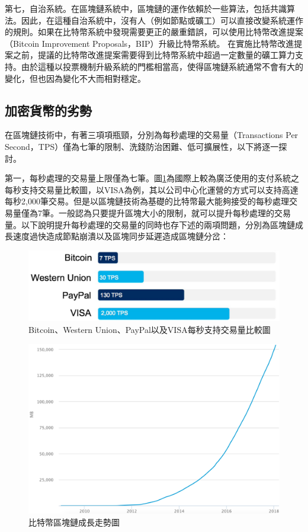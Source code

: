 				第七，自治系統。在區塊鏈系統中，區塊鏈的運作依賴於一些算法，包括共識算法。因此，在這種自治系統中，沒有人（例如節點或礦工）可以直接改變系統運作的規則。如果在比特幣系統中發現需要更正的嚴重錯誤，可以使用比特幣改進提案（Bitcoin Improvement Proposals，BIP）\supercite{BitcoinImprovementProposals}升級比特幣系統。 在實施比特幣改進提案之前，提議的比特幣改進提案需要得到比特幣系統中超過一定數量的礦工算力支持。由於這種以投票機制升級系統的門檻相當高，使得區塊鏈系統通常不會有大的變化，但也因為變化不大而相對穩定。

			\subsection{加密貨幣的劣勢}
			在區塊鏈技術中，有著三項項瓶頸，分別為每秒處理的交易量（Transactions Per Second，TPS）僅為七筆的限制、洗錢防治困難、低可擴展性，以下將逐一探討。

				第一，每秒處理的交易量上限僅為七筆。圖\ref{TPS}為國際上較為廣泛使用的⽀付系統之每秒⽀持交易量⽐較圖，以VISA為例，其以公司中心化運營的方式可以支持高達每秒2,000筆交易。但是以區塊鏈技術為基礎的比特幣最大能夠接受的每秒處理交易量僅為7筆。一般認為只要提升區塊大小的限制，就可以提升每秒處理的交易量。以下說明提升每秒處理的交易量的同時也存下述的兩項問題，分別為區塊鏈成長速度過快造成節點崩潰以及區塊同步延遲造成區塊鏈分岔：

					\begin{figure}[htbp]
						\centering
						\includegraphics[width = .7\textwidth]{TPS.png}
						\caption{Bitcoin、Western Union\supercite{WesternUnion}、PayPal\supercite{PayPal}以及VISA每秒支持交易量比較圖\supercite{digibyte}}\label{TPS}
					\end{figure}

					\begin{figure}[htbp]
						\centering
						\includegraphics[width = .8\textwidth]{blockchainsize.png}
						\caption{比特幣區塊鏈成長走勢圖\supercite{blockchainsize}}\label{blockchainsize}
					\end{figure}


